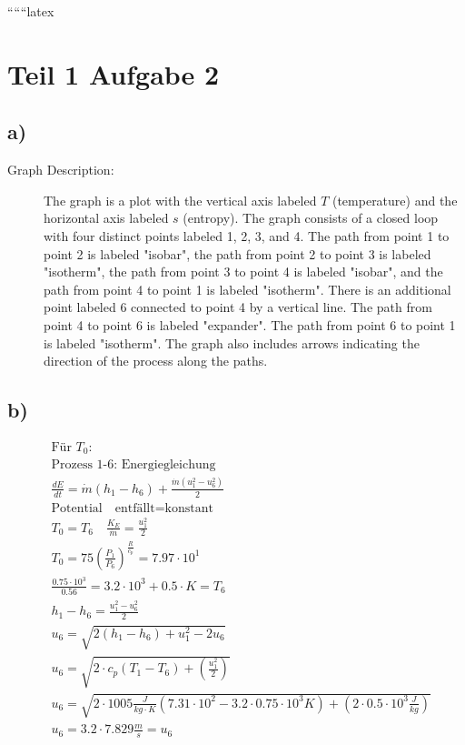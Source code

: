 
``````latex


\section*{Teil 1 Aufgabe 2}

\subsection*{a)}

\begin{description}
    \item[Graph Description:] The graph is a plot with the vertical axis labeled \( T \) (temperature) and the horizontal axis labeled \( s \) (entropy). The graph consists of a closed loop with four distinct points labeled 1, 2, 3, and 4. The path from point 1 to point 2 is labeled "isobar", the path from point 2 to point 3 is labeled "isotherm", the path from point 3 to point 4 is labeled "isobar", and the path from point 4 to point 1 is labeled "isotherm". There is an additional point labeled 6 connected to point 4 by a vertical line. The path from point 4 to point 6 is labeled "expander". The path from point 6 to point 1 is labeled "isotherm". The graph also includes arrows indicating the direction of the process along the paths.
\end{description}

\subsection*{b)}

\begin{align*}
    &\text{Für } T_0: \\
    &\text{Prozess 1-6: Energiegleichung} \\
    &\frac{dE}{dt} = \dot{m} (h_1 - h_6) + \frac{\dot{m} (u_1^2 - u_6^2)}{2} \\
    &\text{Potential} \quad \text{entfällt} = \text{konstant} \\
    &T_0 = T_6 \quad \frac{K_E}{\dot{m}} = \frac{u_1^2}{2} \\
    &T_0 = 75 \left( \frac{P_1}{P_6} \right)^{\frac{R}{c_p}} = 7.97 \cdot 10^1 \\
    &\frac{0.75 \cdot 10^3}{0.56} = 3.2 \cdot 10^3 + 0.5 \cdot K = T_6 \\
    &h_1 - h_6 = \frac{u_1^2 - u_6^2}{2} \\
    &u_6 = \sqrt{2 \left( h_1 - h_6 \right) + u_1^2 - 2u_6} \\
    &u_6 = \sqrt{2 \cdot c_p (T_1 - T_6) + \left( \frac{u_1^2}{2} \right)} \\
    &u_6 = \sqrt{2 \cdot 1005 \frac{J}{kg \cdot K} \left( 7.31 \cdot 10^2 - 3.2 \cdot 0.75 \cdot 10^3 K \right) + \left( 2 \cdot 0.5 \cdot 10^3 \frac{J}{kg} \right)} \\
    &u_6 = 3.2 \cdot 7.829 \frac{m}{s} = u_6
\end{align*}

